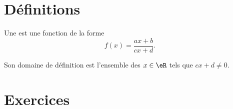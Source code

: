 
\section{Définitions}

\begin{definition}
    Une  est une fonction de la forme
    \begin{equation}
        f(x)=\frac{ ax+b }{ cx+d }.
    \end{equation}
\end{definition}
Son domaine de définition est l'ensemble des \( x\in \eR\) tels que \( cx+d\neq 0\).

\section{Exercices}

